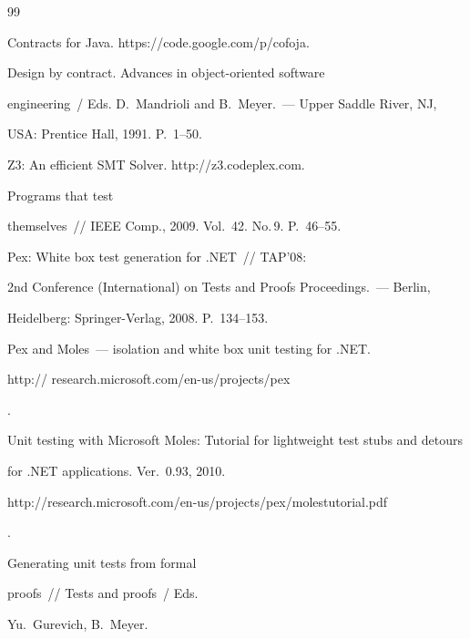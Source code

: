 {\small\frenchspacing


{%




\begin{thebibliography}{99}




Contracts for Java. {\sf https://code.google.com/p/cofoja}.




 Design by contract. Advances in object-oriented software


engineering~/ Eds. D.~Mandrioli and B.~Meyer.~--- Upper Saddle River, NJ,


USA: Prentice Hall, 1991. P.~1--50.




Z3: An efficient SMT Solver. {\sf http://z3.codeplex.com}.




 Programs that test


themselves~/\!\!/ IEEE Comp., 2009. Vol.~42. No.\,9. P.~46--55.




 Pex: White box test generation for .NET~/\!\!/ TAP'08:


2nd Conference (International) on Tests and Proofs Proceedings.~--- Berlin,


Heidelberg: Springer-Verlag, 2008. P.~134--153.




Pex and Moles~--- isolation and white box unit testing for .NET. {\sf


http:// research.microsoft.com/en-us/projects/pex}.




Unit testing with Microsoft Moles: Tutorial for lightweight test stubs and detours


for .NET applications. Ver.~0.93, 2010. {\sf


http://research.microsoft.com/en-us/projects/pex/molestutorial.pdf}.




 Generating unit tests from formal


proofs~/\!\!/  Tests and proofs~/ Eds.


Yu.~Gurevich, B.~Meyer.



\end{thebibliography}}}
